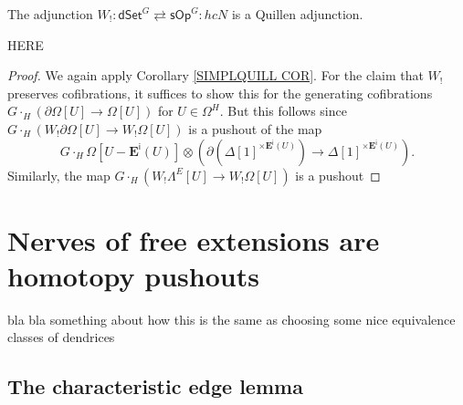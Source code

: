 \documentclass[a4paper,10pt
,draft
]{article}%
\renewcommand{\1}{\eta}%
\begin{document}
\begin{proposition}
	The adjunction 
$W_! \colon \mathsf{dSet}^G 
	\rightleftarrows 
\mathsf{sOp}^G \colon hcN$
	is a Quillen adjunction.
\end{proposition}

{\color{red} HERE}

\begin{proof}
	We again apply Corollary \ref{SIMPLQUILL COR}.
	For the claim that $W_!$ preserves cofibrations,
	it suffices to show this for the generating cofibrations
	$G\cdot_H \left( \partial \Omega[U] \to \Omega[U] \right)$ for $U \in \Omega^H$.
	But this follows since 
	$G \cdot_H \left(W_! \partial \Omega[U] \to W_! \Omega[U] \right)$
	is a pushout of the map
\[
	G \cdot_H \Omega[U - \boldsymbol{E}^{\mathsf{i}}(U)]
\otimes
	\left(
	\partial \left( \Delta[1]^{\times \boldsymbol{E}^{\mathsf{i}}(U) } \right) 
		\to
	\Delta[1]^{\times \boldsymbol{E}^{\mathsf{i}}(U) }
	\right).
\]
Similarly, the map
	$G \cdot_H \left(W_! \Lambda^E[U] \to W_! \Omega[U] \right)$
is a pushout 


	
\end{proof}




\newpage







\section{Nerves of free extensions are homotopy pushouts}



{\color{red} bla bla something about how this is the same as choosing some nice equivalence classes of dendrices}

\subsection{The characteristic edge lemma}
\end{document}

